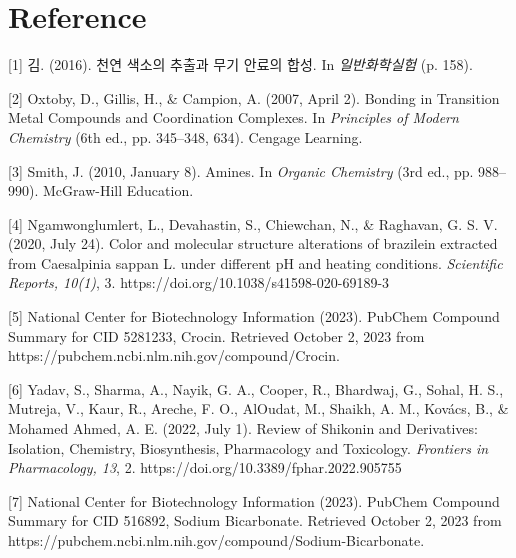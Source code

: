 \documentclass[%
 reprint,
 amsmath,amssymb,
 aps,
]{revtex4-2}
\begin{document}
\section{\label{sec:level1}Reference}
[1] 김. (2016). 천연 색소의 추출과 무기 안료의 합성. In \textit{일반화학실험} (p. 158).

[2] Oxtoby, D., Gillis, H., \& Campion, A. (2007, April 2). Bonding in Transition Metal Compounds and Coordination Complexes. In \textit{Principles of Modern Chemistry} (6th ed., pp. 345–348, 634). Cengage Learning.

[3] Smith, J. (2010, January 8). Amines. In \textit{Organic Chemistry} (3rd ed., pp. 988–990). McGraw-Hill Education.

[4] Ngamwonglumlert, L., Devahastin, S., Chiewchan, N., \& Raghavan, G. S. V. (2020, July 24). Color and molecular structure alterations of brazilein extracted from Caesalpinia sappan L. under different pH and heating conditions. \textit{Scientific Reports, 10(1)}, 3. https://doi.org/10.1038/s41598-020-69189-3

[5] National Center for Biotechnology Information (2023). PubChem Compound Summary for CID 5281233, Crocin. Retrieved October 2, 2023 from https://pubchem.ncbi.nlm.nih.gov/compound/Crocin.

[6] Yadav, S., Sharma, A., Nayik, G. A., Cooper, R., Bhardwaj, G., Sohal, H. S., Mutreja, V., Kaur, R., Areche, F. O., AlOudat, M., Shaikh, A. M., Kovács, B., \& Mohamed Ahmed, A. E. (2022, July 1). Review of Shikonin and Derivatives: Isolation, Chemistry, Biosynthesis, Pharmacology and Toxicology. \textit{Frontiers in Pharmacology, 13}, 2. https://doi.org/10.3389/fphar.2022.905755

[7] National Center for Biotechnology Information (2023). PubChem Compound Summary for CID 516892, Sodium Bicarbonate. Retrieved October 2, 2023 from https://pubchem.ncbi.nlm.nih.gov/compound/Sodium-Bicarbonate.
\end{document}
